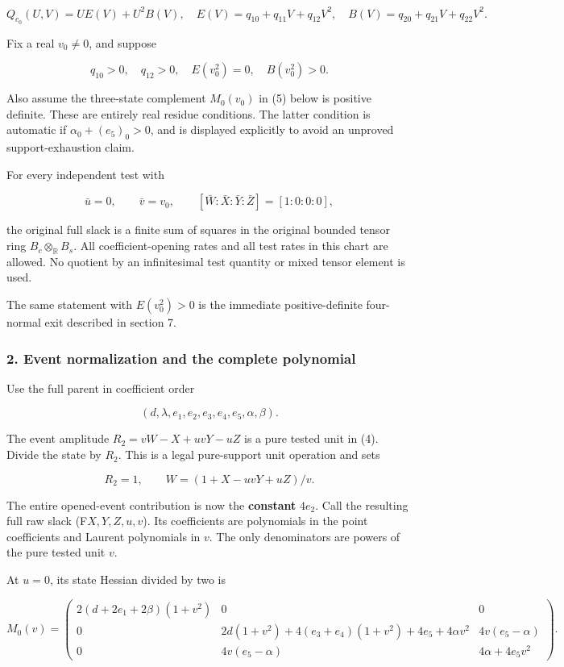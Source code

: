 \[
Q_{c_0}(U,V)=U E(V)+U^2 B(V),
\quad E(V)=q_{10}+q_{11}V+q_{12}V^2,
\quad B(V)=q_{20}+q_{21}V+q_{22}V^2.
\tag{2}
\]

Fix a real \(v_0\ne0\), and suppose

\[
q_{10}>0,\quad q_{12}>0,\quad E(v_0^2)=0,\quad B(v_0^2)>0.
\tag{3}
\]

Also assume the three-state complement \(M_0(v_0)\) in (5) below is positive
definite. These are entirely real residue conditions. The latter condition
is automatic if \(\alpha_0+(e_5)_0>0\), and is displayed explicitly to avoid
an unproved support-exhaustion claim.

For every independent test with

\[
\bar u=0,\qquad \bar v=v_0,
\qquad [\bar W:\bar X:\bar Y:\bar Z]=[1:0:0:0],
\tag{4}
\]

the original full slack is a finite sum of squares in the original bounded
tensor ring \(B_c\otimes_{\mathbb R}B_s\). All coefficient-opening rates and
all test rates in this chart are allowed. No quotient by an infinitesimal
test quantity or mixed tensor element is used.

The same statement with \(E(v_0^2)>0\) is the immediate positive-definite
four-normal exit described in section 7.

\hypertarget{event-normalization-and-the-complete-polynomial}{%
\subsubsection*{2. Event normalization and the complete polynomial}\label{p4ec1a51262f9:event-normalization-and-the-complete-polynomial}}

Use the full parent in coefficient order

\[
(d,\lambda,e_1,e_2,e_3,e_4,e_5,\alpha,\beta).
\]

The event amplitude \(R_2=vW-X+uvY-uZ\) is a pure tested unit in (4).
Divide the state by \(R_2\). This is a legal pure-support unit operation and
sets

\[
R_2=1,\qquad W=(1+X-uvY+uZ)/v.
\]

The entire opened-event contribution is now the \textbf{constant} \(4e_2\).
Call the resulting full raw slack (F\(X,Y,Z,u,v\)). Its coefficients are
polynomials in the point coefficients and Laurent polynomials in \(v\).
The only denominators are powers of the pure tested unit \(v\).

At \(u=0\), its state Hessian divided by two is

\[
M_0(v)=
\begin{pmatrix}
2(d+2e_1+2\beta)(1+v^2)&0&0\\
0&2d(1+v^2)+4(e_3+e_4)(1+v^2)+4e_5+4\alpha v^2
 &4v(e_5-\alpha)\\
0&4v(e_5-\alpha)&4\alpha+4e_5v^2
\end{pmatrix}.
\tag{5}
\]

